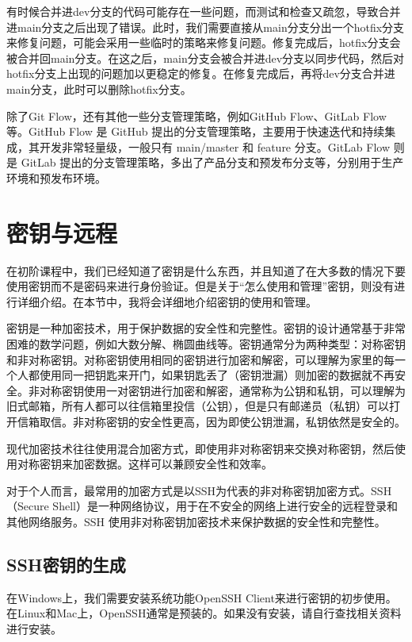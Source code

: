 有时候合并进dev分支的代码可能存在一些问题，而测试和检查又疏忽，导致合并进main分支之后出现了错误。此时，我们需要直接从main分支分出一个hotfix分支来修复问题，可能会采用一些临时的策略来修复问题。修复完成后，hotfix分支会被合并回main分支。在这之后，main分支会被合并进dev分支以同步代码，然后对hotfix分支上出现的问题加以更稳定的修复。在修复完成后，再将dev分支合并进main分支，此时可以删除hotfix分支。

除了Git Flow，还有其他一些分支管理策略，例如GitHub Flow、GitLab Flow等。GitHub Flow 是 GitHub 提出的分支管理策略，主要用于快速迭代和持续集成，其开发非常轻量级，一般只有 main/master 和 feature 分支。GitLab Flow 则是 GitLab 提出的分支管理策略，多出了产品分支和预发布分支等，分别用于生产环境和预发布环境。

\section{密钥与远程}

在初阶课程中，我们已经知道了密钥是什么东西，并且知道了在大多数的情况下要使用密钥而不是密码来进行身份验证。但是关于“怎么使用和管理”密钥，则没有进行详细介绍。在本节中，我将会详细地介绍密钥的使用和管理。

密钥是一种加密技术，用于保护数据的安全性和完整性。密钥的设计通常基于非常困难的数学问题，例如大数分解、椭圆曲线等。密钥通常分为两种类型：对称密钥和非对称密钥。对称密钥使用相同的密钥进行加密和解密，可以理解为家里的每一个人都使用同一把钥匙来开门，如果钥匙丢了（密钥泄漏）则加密的数据就不再安全。非对称密钥使用一对密钥进行加密和解密，通常称为公钥和私钥，可以理解为旧式邮箱，所有人都可以往信箱里投信（公钥），但是只有邮递员（私钥）可以打开信箱取信。非对称密钥的安全性更高，因为即使公钥泄漏，私钥依然是安全的。

现代加密技术往往使用混合加密方式，即使用非对称密钥来交换对称密钥，然后使用对称密钥来加密数据。这样可以兼顾安全性和效率。

对于个人而言，最常用的加密方式是以SSH为代表的非对称密钥加密方式。SSH（Secure Shell）是一种网络协议，用于在不安全的网络上进行安全的远程登录和其他网络服务。SSH 使用非对称密钥加密技术来保护数据的安全性和完整性。

\subsection{SSH密钥的生成}

在Windows上，我们需要安装系统功能OpenSSH Client来进行密钥的初步使用。在Linux和Mac上，OpenSSH通常是预装的。如果没有安装，请自行查找相关资料进行安装。

